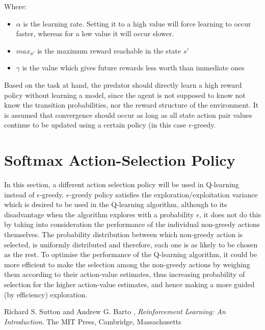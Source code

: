 \documentclass[11pt]{article}
\begin{document}
\noindent Where:
\begin{itemize}
	\item $\alpha$ is the learning rate. Setting it to a high value will force learning to occur faster, whereas for a low value it will occur slower.
	\item $max_{a'}$ is the maximum reward reachable in the state $s'$
	\item $\gamma$ is the value which gives future rewards less worth than immediate ones
\end{itemize}
\vspace*{10mm}



Based on the task at hand, the predator should directly learn a high reward policy without learning a model, since the agent is not supposed to know not know the transition probabilities, nor the reward structure of the environment. It is assumed that convergence should occur as long as all state action pair values continue to be updated using a certain policy (in this case $\epsilon$-greedy. 





\section{Softmax Action-Selection Policy}

In this section, a different action selection policy will be used in Q-learning instead of $\epsilon$-greedy. $\epsilon$-greedy policy satisfies the exploration/exploitation variance which is desired to be used in the Q-learning algorithm, although to its disadvantage when the algorithm explores with a probability $\epsilon$, it does not do this by taking into consideration the performance of the individual non-greedy actions themselves. The probability distribution between which non-greedy action is selected, is uniformly distributed and therefore, each one is as likely to be chosen as the rest. To optimise the performance of the Q-learning algorithm, it could be more efficient to make the selection among the non-greedy actions by weighing them according to their action-value estimates, thus increasing probability of selection for the higher action-value estimates, and hence making a more guided (by efficiency) exploration.



\begin{thebibliography}{9}

  Richard S. Sutton and Andrew G. Barto ,
  \emph{Reinforcement Learning: An Introduction}.
  The MIT Press, Cambridge, Massachusetts

\end{thebibliography}
\end{document}
